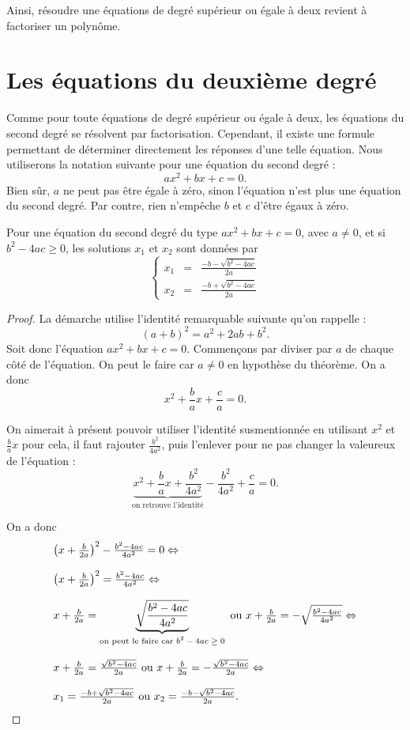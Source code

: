 Ainsi, résoudre une équations de degré supérieur ou égale à deux revient à factoriser un polynôme.

\section{Les équations du deuxième degré}\label{seconddegre}

Comme pour toute équations de degré supérieur ou égale à deux, les équations du second degré se résolvent par factorisation. Cependant, il existe une formule permettant de déterminer directement les réponses d'une telle équation. Nous utiliserons la notation suivante pour une équation du second degré :
$$
ax^2 + bx + c = 0.
$$
Bien sûr, $a$ ne peut pas être égale à zéro, sinon l'équation n'est plus une équation du second  degré. Par contre, rien n'empêche $b$ et $c$ d'être égaux à zéro.

\begin{theoreme}\label{completion}
Pour une équation du second degré du type $ax^2 + bx + c = 0$, avec $a\neq 0$, et si $b^2 -4ac \geq 0$, les solutions $x_1$ et $x_2$ sont données par
$$
\left\{
\begin{array}{lcl}
x_1 &=& \frac{-b-\sqrt{b^2 - 4ac}}{2a}\\
x_2 &=& \frac{-b+\sqrt{b^2-4ac}}{2a}
\end{array}
\right.
$$
\end{theoreme}

\begin{proof}
La démarche utilise l'identité remarquable suivante qu'on rappelle :
$$
(a+b)^2 = a^2 + 2ab + b^2.
$$
Soit donc l'équation $ax^2 + bx + c =0$. Commençons par diviser par $a$ de chaque côté de l'équation. On peut le faire car $a\neq 0$ en hypothèse du théorème. On a donc
$$
x^2 + \frac{b}{a}x + \frac{c}{a} = 0.
$$

On aimerait à présent pouvoir utiliser l'identité susmentionnée en utilisant $x^2$ et $\frac{b}{a}x$ pour cela, il faut rajouter $\frac{b^2}{4a^2}$, puis l'enlever pour ne pas changer la valeureux de l'équation :
$$
\underbrace{x^2 + \frac{b}{a}x + \frac{b^2}{4a^2}}_\textrm{on retrouve l'identité} - \frac{b^2}{4a^2} + \frac{c}{a} = 0.
$$

On a donc 
$$
\begin{array}{l}
\left(x+\frac{b}{2a}\right)^2 - \frac{b^2 - 4ac}{4a^2} = 0 \Leftrightarrow\\
\\
\left(x+\frac{b}{2a}\right)^2 = \frac{b^2 - 4ac}{4a^2}  \Leftrightarrow \\
\\
x+\frac{b}{2a} = \underbrace{\sqrt{\frac{b^2 - 4ac}{4a^2}}}_\textrm{on peut le faire car $b^2-4ac\geq 0$} \mbox{ ou } x+\frac{b}{2a} = -\sqrt{\frac{b^2 - 4ac}{4a^2}}\Leftrightarrow \\
\\
x+\frac{b}{2a} = \frac{\sqrt{b^2 - 4ac}}{2a} \mbox{ ou } x+\frac{b}{2a} = -\frac{\sqrt{b^2 - 4ac}}{2a}\Leftrightarrow \\
\\
x_1 = \frac{-b+\sqrt{b^2 - 4ac}}{2a} \mbox{ ou } x_2 = \frac{-b-\sqrt{b^2 - 4ac}}{2a}.
\end{array}
$$
\end{proof}

